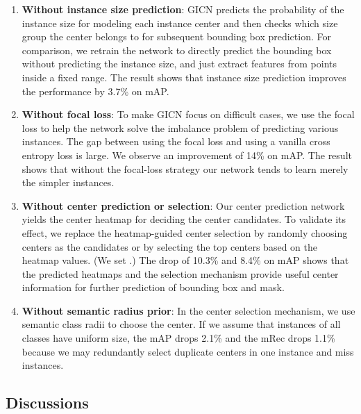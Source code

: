 \documentclass[runningheads]{llncs}
\begin{document}
\begin{enumerate}

  \item {\bf Without instance size prediction}:
  GICN predicts the probability of the instance size for modeling each instance center and then checks which size group the center belongs to for subsequent bounding box prediction. For comparison, we retrain the network to directly predict the bounding box without predicting the instance size, and just extract features from points inside a fixed range. The result shows that instance size prediction improves the performance by 3.7\% on mAP.
  
  \item {\bf Without focal loss}:
  To make GICN focus on difficult cases, we use the focal loss \cite{LinPRKP17} to help the network solve the imbalance problem of predicting various instances. The gap between using the focal loss and using a vanilla cross entropy loss is large. We observe an improvement of 14\% on mAP. The result shows that without the focal-loss strategy our network tends to learn merely the simpler instances.

  \item {\bf Without center prediction or selection}: 
  Our center prediction network yields the center heatmap for deciding the center candidates. To validate its effect, we replace the heatmap-guided center selection by randomly choosing  centers as the candidates or by selecting the top  centers based on the heatmap values. (We set .) The drop of 10.3\% and 8.4\% on mAP shows that the predicted heatmaps and the selection mechanism provide useful center information for further prediction of bounding box and mask.


  
  \item {\bf Without semantic radius prior}:
  In the center selection mechanism, we use semantic class radii to choose the center. If we assume that instances of all classes have uniform size, the mAP drops 2.1\% and the mRec drops 1.1\% because we may redundantly select duplicate centers in one instance and miss instances.
\end{enumerate}





\subsection{Discussions}
\end{document}
